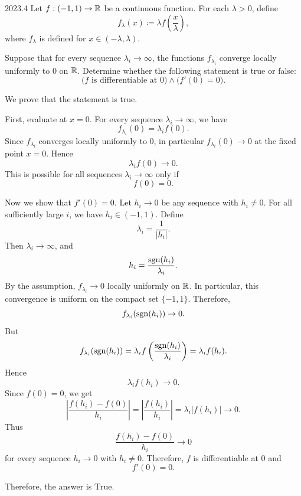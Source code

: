     \begin{pastproblem}{2023.4}
        Let $f:(-1,1)\to\mathbb{R}$ be a continuous function. For each $\lambda>0$, define
        \[
            f_\lambda(x)
            \coloneqq
            \lambda f\left(\frac{x}{\lambda}\right),
        \]
        where $f_\lambda$ is defined for $x\in(-\lambda,\lambda)$.

        Suppose that for every sequence $\lambda_i\to\infty$, the functions $f_{\lambda_i}$ converge
        locally uniformly to $0$ on $\mathbb{R}$. Determine whether the following statement is true or
        false:
        \[
            \bigl(f\text{ is differentiable at }0\bigr)
            \land
            \bigl(f'(0)=0\bigr).
        \]
    \end{pastproblem}

    \begin{solution}
        We prove that the statement is true.

        First, evaluate at $x=0$. For every sequence $\lambda_i\to\infty$, we have
        \[
            f_{\lambda_i}(0)
            =
            \lambda_i f(0).
        \]
        Since $f_{\lambda_i}$ converges locally uniformly to $0$, in particular $f_{\lambda_i}(0)\to
        0$ at the fixed point $x=0$. Hence
        \[
            \lambda_i f(0)\to 0.
        \]
        This is possible for all sequences $\lambda_i\to\infty$ only if
        \[
            f(0)=0.
        \]

        Now we show that $f'(0)=0$. Let $h_i\to 0$ be any sequence with $h_i\neq 0$. For all
        sufficiently large $i$, we have $h_i\in(-1,1)$. Define
        \[
            \lambda_i=\frac{1}{|h_i|}.
        \]
        Then $\lambda_i\to\infty$, and
        \[
            h_i=\frac{\operatorname{sgn}(h_i)}{\lambda_i}.
        \]
        By the assumption, $f_{\lambda_i}\to 0$ locally uniformly on $\mathbb{R}$. In particular, this
        convergence is uniform on the compact set $\{-1,1\}$. Therefore,
        \[
            f_{\lambda_i}(\operatorname{sgn}(h_i))\to 0.
        \]
        But
        \[
            f_{\lambda_i}(\operatorname{sgn}(h_i))
            =
            \lambda_i
            f\left(
                \frac{\operatorname{sgn}(h_i)}{\lambda_i}
            \right)
            =
            \lambda_i f(h_i).
        \]
        Hence
        \[
            \lambda_i f(h_i)\to 0.
        \]
        Since $f(0)=0$, we get
        \[
            \left|
                \frac{f(h_i)-f(0)}{h_i}
            \right|
            =
            \left|
                \frac{f(h_i)}{h_i}
            \right|
            =
            \lambda_i |f(h_i)|
            \to 0.
        \]
        Thus
        \[
            \frac{f(h_i)-f(0)}{h_i}\to 0
        \]
        for every sequence $h_i\to 0$ with $h_i\neq 0$. Therefore, $f$ is differentiable at $0$ and
        \[
            f'(0)=0.
        \]

        Therefore, the answer is $\boxed{\text{True}}$.
    \end{solution}

